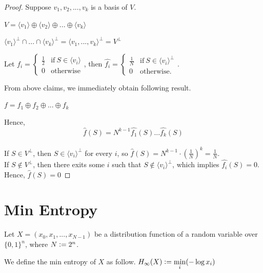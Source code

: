 \begin{proof}
Suppose $v_1, v_2,..., v_k $ is a basis of $V$.

\begin{claim}
$V = \langle v_1 \rangle \oplus \langle v_2 \rangle 
	 \oplus ... \oplus \langle v_k \rangle $
\end{claim}

\begin{claim}
${\langle v_1 \rangle}^\perp \cap ... \cap {\langle v_k \rangle}^\perp
= {\langle v_1, ..., v_k \rangle}^\perp = V^\perp$
\end{claim}

\noindent Let $f_i = \begin{cases}
	\frac{1}{2} & \text{if} \ S \in \langle v_i \rangle \\
	0             & \text{otherwise}
\end{cases}$, 
then $\widehat{f_i} = \begin{cases}
	\frac{1}{N} & \text{if} \ S \in {\langle v_i \rangle}^ \perp \\
	0             & \text{otherwise}.
\end{cases}$. 

\noindent From above claims, we immediately obtain following result.
\begin{claim}
$f = f_1 \oplus f_2 \oplus ... \oplus f_k$
\end{claim}

\noindent Hence,
$$\widehat{f}(S) = N^{k-1} \widehat{f_1}(S) ... \widehat{f_k}(S)$$ \\
If $S \in V^\perp$, then $S \in {\langle v_i \rangle}^\perp$ for every $i$, so $\widehat{f}(S) = N^{k-1} \cdot (\frac{1}{N})^k = \frac{1}{N}$. \\
If $S \not\in V^\perp$, then there exits some $i$ such that $S \not\in {\langle v_i \rangle}^\perp$, which implies $\widehat{f_i}(S) = 0$. Hence, $\widehat{f}(S) = 0$
\end{proof}

\chapter{Min Entropy}
Let $X = (x_0, x_1, ..., x_{N-1})$ be a distribution function of a random variable over $\{ 0, 1 \}^n$, where $N \vcentcolon= 2^n$. 
\begin{definition}
We define the min entropy of $X$ as follow.\center
$H_\infty (X) \vcentcolon= \min\limits_{i} (- \log x_i)$
\end{definition}

